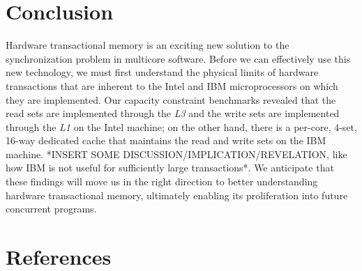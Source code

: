\documentclass{article}
\begin{document}
\section{Conclusion}
Hardware transactional memory is an exciting new solution to the synchronization
problem in multicore software. Before we can effectively use this new
technology, we must first understand the physical limits of hardware
transactions that are inherent to the Intel and IBM microprocessors on which
they are implemented. Our capacity constraint benchmarks revealed that the read
sets are implemented through the \textit{L3} and the write sets are implemented
through the \textit{L1} on the Intel machine; on the other hand, there is a
per-core, 4-set, 16-way dedicated cache that maintains the read and write sets
on the IBM machine. *INSERT SOME DISCUSSION/IMPLICATION/REVELATION, like how IBM
is not useful for sufficiently large transactions*. We anticipate that these
findings will move us in the right direction to better understanding hardware
transactional memory, ultimately enabling its proliferation into future
concurrent programs.

\section{References}
\end{document}
